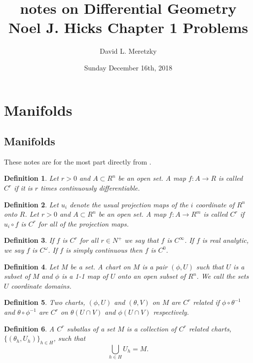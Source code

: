 \documentclass{article}
\title{ \vspace{-10ex} %
notes on Differential Geometry\\
Noel J. Hicks
Chapter 1 Problems
}
\author{David L. Meretzky
}
\date{%
Sunday December 16th, 2018
}
\theoremstyle{problemstyle}
\theoremstyle{problemstyle}
\theoremstyle{problemstyle}
\newtheorem{definition}{Definition}
\theoremstyle{problemstyle}
\theoremstyle{problemstyle}
\begin{document}
\maketitle

\section{Manifolds}

\subsection{Manifolds}

These notes are for the most part directly from \cite{Hicks65}. 

\begin{definition}
Let $r > 0$ and $A \subset R^n$ be an open set. A map $f:A \rightarrow R$ is called $C^r$ if it is $r$ times continuously differentiable.   
\end{definition}

\begin{definition}\label{projection}
Let $u_i$ denote the usual projection maps of the $i$ coordinate of $R^n$ onto $R$.  Let $r > 0$ and $A \subset R^n$ be an open set. A map $f:A \rightarrow R^m$ is called $C^r$ if $u_i \circ f$ is $C^r$ for all of the projection maps.  
\end{definition}

\begin{definition}
If $f$ is $C^r$ for all $r \in N^+$ we say that $f$ is $C^\infty$. If $f$ is real analytic, we say $f$ is $C^\omega$. If $f$ is simply continuous then $f$ is $C^0$.  
\end{definition}

\begin{definition}\label{chart}
Let $M$ be a set. A chart on $M$ is a pair $(\phi,U)$ such that $U$ is a subset of $M$ and $\phi$ is a 1-1 map of $U$ onto an open subset of $R^n$. We call the sets $U$ coordinate domains. 
\end{definition}

\begin{definition}
Two charts, $(\phi,U)$ and $(\theta,V)$ on $M$ are $C^r$ related if $\phi \circ \theta^{-1}$ and $\theta \circ \phi^{-1}$ are $C^r$ on $\theta(U \cap V)$ and $\phi(U \cap V)$ respectively. 
\end{definition}

\begin{definition}\label{subatlas}
A $C^r$ subatlas of a set $M$ is a collection of $C^r$ related charts, $\{(\theta_h,U_h)\}_{h \in H}$, such that $$\bigcup_{h \in H}U_h = M.$$
\end{definition}
\end{document}
